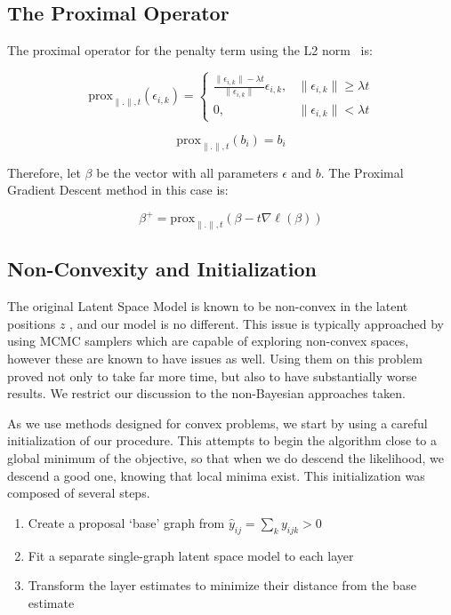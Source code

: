 \documentclass{article}
\begin{document}
\subsection{The Proximal Operator}

The proximal operator for the penalty term using the L2 norm\footnotemark~ is:


\[
\text{prox}_{\|.\|, t}(\epsilon_{i,k}) = 
\begin{cases}
\frac{\|\epsilon_{i,k}\| - \lambda t}{\|\epsilon_{i,k}\|}\epsilon_{i,k}, & \|\epsilon_{i,k}\| \ge \lambda t \\
0, & \|\epsilon_{i,k}\| < \lambda t
\end{cases}
\]

\[
\text{prox}_{\|.\|, t}(b_i) = b_i
\]

Therefore, let $\beta$ be the vector with all parameters $\epsilon$ and $b$. The Proximal Gradient Descent method in this case is:

\[
\beta^{+} = \text{prox}_{\|.\|, t}(\beta - t \nabla \ell(\beta))
\]

\subsection{Non-Convexity and Initialization}
The original Latent Space Model is known to be non-convex in the latent positions $z$ \cite{hoff}, and our model is no different. This issue is typically approached by using MCMC samplers \cite{hoff, stan} which are capable of exploring non-convex spaces, however these are known to have issues as well. Using them on this problem proved not only to take far more time, but also to have substantially worse results. We restrict our discussion to the non-Bayesian approaches taken.

As we use methods designed for convex problems, we start by using a careful initialization of our procedure. This attempts to begin the algorithm close to a global minimum of the objective, so that when we do descend the likelihood, we descend a good one, knowing that local minima exist. This initialization was composed of several steps.
\\
\begin{enumerate}
\item Create a proposal `base' graph from $\hat{y}_{ij} =\sum_k y_{ijk} > 0$
\item Fit a separate single-graph latent space model to each layer
\item Transform the layer estimates to minimize their distance from the base estimate
\end{enumerate}
\end{document}
